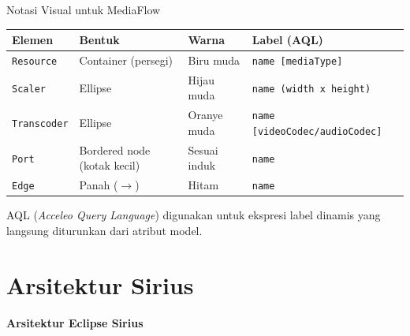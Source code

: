 \documentclass[aspectratio=169, table]{beamer}
\begin{document}
\begin{frame}{Notasi Visual untuk MediaFlow}
\vspace{6pt}
\centering
\footnotesize
\begin{tabular}{|l|l|l|l|}
\hline
\rowcolor{blue!12}
\textbf{Elemen} & \textbf{Bentuk} & \textbf{Warna} & \textbf{Label (AQL)} \\
\hline
\texttt{Resource} & Container (persegi) & Biru muda & \texttt{name [mediaType]} \\
\hline
\texttt{Scaler} & Ellipse & Hijau muda & \texttt{name (width x height)} \\
\hline
\texttt{Transcoder} & Ellipse & Oranye muda & \texttt{name [videoCodec/audioCodec]} \\
\hline
\texttt{Port} & Bordered node (kotak kecil) & Sesuai induk & \texttt{name} \\
\hline
\texttt{Edge} & Panah ($\rightarrow$) & Hitam & \texttt{name} \\
\hline
\end{tabular}

\vspace{10pt}
\small
AQL (\textit{Acceleo Query Language}) digunakan untuk ekspresi label dinamis yang langsung diturunkan dari atribut model.
\end{frame}

\section{Arsitektur Sirius}
\begin{frame}{\hfill}
	\centering
	\Huge{\textbf{Arsitektur Eclipse Sirius}}
\end{frame}
\end{document}
